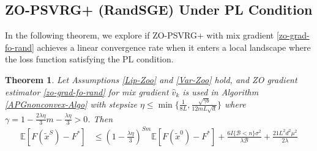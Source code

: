 \documentclass{article}
\newcommand*{\E}{\mathbb{E}}
\newtheorem{theorem}{Theorem}[section]
\theoremstyle{definition}
\theoremstyle{remark}
\begin{document}
\subsection{ZO-PSVRG+ (RandSGE) Under PL Condition}
In the following theorem, we explore if ZO-PSVRG+ with mix gradient \eqref{zo-grad-fo-rand} achieves a linear convergence rate when it enters a local landscape where the loss function satisfying the PL condition.
\begin{theorem}\label{PL-Zoo-rand}
Let Assumptions \ref{Lip-Zoo} and \ref{Var-Zoo} hold, and  ZO gradient estimator \eqref{zo-grad-fo-rand} for mix gradient $\hat{v}_k$ is used in
 Algorithm \ref{APGnonconvex-Algo} with stepsize $\eta \leq \min\{\frac{1}{8L}, \frac{\sqrt{\gamma b}}{12 m L \sqrt{d}}\}$ where $\gamma = 1-\frac{2\lambda\eta}{3} m-\frac{\lambda\eta}{3} > 0$. Then 
\begin{equation}\label{PL-eq-error-rand}
\begin{split}
\E[F(\tilde{x}^S) - {F}^*] & \leq   \left(1-\frac{\lambda\eta}{3}\right)^{Sm} \E[F(\tilde{x}^0) - {F}^*] + \frac{6I\{\mathcal{B} < n\} \sigma ^2}{\lambda\mathcal{B}}+\frac{21 L^2 d^2 \mu^2}{2\lambda}
\end{split}
\end{equation}
\end{theorem}
\end{document}
